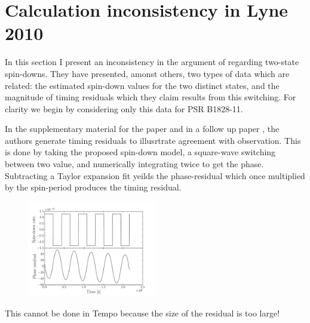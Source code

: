 \documentclass[/home/greg/Thesis/main/main.tex]{subfiles}
\begin{document}
\graphicspath{{/home/greg/Neutron_star_modelling/LyneSwitchingAnalytic/LyneErrorCalculation/}}

\section{Calculation inconsistency in Lyne 2010}
In this section I present an inconsistency in the argument of \citet{Lyne2010}
regarding two-state spin-downs. They have presented, amonst others, two types
of data which are related: the estimated spin-down values for the two distinct
states, and the magnitude of timing residuals which they claim results from
this switching. For clarity we begin by considering only this data for PSR
B1828-11. 

In the supplementary material for the paper and in a follow up paper 
\citet{Perrera2014}, the authors generate timing residuals to illusrtrate 
agreement with observation. This is done by taking the proposed spin-down
model, a square-wave switching between two value, and numerically integrating twice to 
get the phase. Subtracting a Taylor expansion fit yeilds the phase-residual which
once multiplied by the spin-period produces the timing residual.

\begin{figure}[htb]
\centering
\includegraphics[width=0.5\textwidth]{LyneErrorPlot}
\caption{}
\label{fig:}
\end{figure}

This cannot be done in Tempo because the size of the residual is too large!
\end{document}
